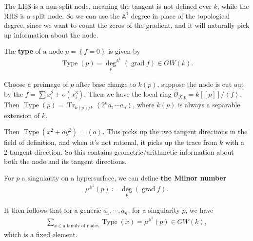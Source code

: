 The LHS is a non-split node, meaning the tangent is not defined over
\(k\), while the RHS is a split node. So we can use the
\({\mathbb{A}}^1\) degree in place of the topological degree, since we
want to count the zeros of the gradient, and it will naturally pick up
information about the node.

\begin{definition}

The \textbf{type} of a node \(p = \left\{{f=0}\right\}\) is given by
\begin{align*}
\operatorname{Type}(p) = \underset p \deg^{{\mathbb{A}}^1} (\operatorname{grad}f) \in GW(k).
\end{align*}

\end{definition}

\begin{example}[?]

Choose a preimage of \(p\) after base change to \(k(p)\), suppose the
node is cut out by the \(f = \sum x_i^2 + o(x_i^3)\). Then we have the
local ring
\(\widehat{\mathcal{O}}_{X. p} = k[[p]] / \left\langle{f}\right\rangle\).
Then
\(\operatorname{Type}(p) = \operatorname{Tr}_{k(p)/ k}\left\langle{2^n a_1 \cdots a_n}\right\rangle\),
where \(k(p)\) is always a separable extension of \(k\).

Then \(\operatorname{Type}(x^2+ay^2) = \left\langle{a}\right\rangle\).
This picks up the two tangent directions in the field of definition, and
when it's not rational, it picks up the trace from \(k\) with a
2-tangent direction. So this contains geometric/arithmetic information
about both the node and its tangent directions.

\end{example}

\begin{definition}

For \(p\) a singularity on a hypersurface, we can define \textbf{the
Milnor number}
\begin{align*}
\mu^{{\mathbb{A}}^1}(p) \coloneqq\underset p \deg (\operatorname{grad}f)
.\end{align*}

\end{definition}

\begin{theorem}

It then follows that for a generic \(a_1,\cdots,a_n\), for a singularity
\(p\), we have
\begin{align*}
\sum_{x \in \text{a family of nodes}} \operatorname{Type} (x) = \mu^{{\mathbb{A}}^1}(p) \in GW(k),
\end{align*}
which is a fixed element.

\end{theorem}

